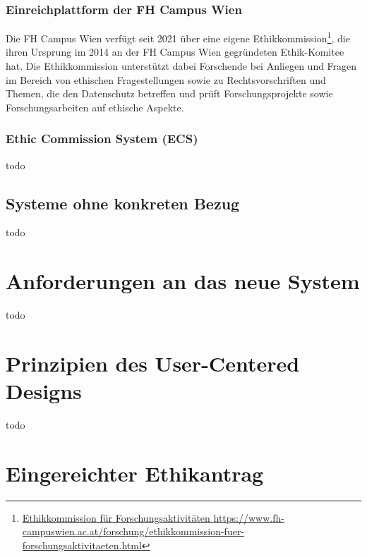 \documentclass[a4paper,12pt,twoside]{scrreprt}
\begin{document}
\subsection{Einreichplattform der FH Campus Wien}
\label{sub-sec:einreichplattform-fh-campus-wien}

Die FH Campus Wien verfügt seit 2021 über eine eigene Ethikkommission\footnote{\href{https://www.fh-campuswien.ac.at/forschung/ethikkommission-fuer-forschungsaktivitaeten.html}{Ethikkommission für Forschungsaktivitäten \url{https://www.fh-campuswien.ac.at/forschung/ethikkommission-fuer-forschungsaktivitaeten.html}}}, die ihren Ursprung im 2014 an der FH Campus Wien gegründeten Ethik-Komitee hat. Die Ethikkommission unterstützt dabei Forschende bei Anliegen und Fragen im Bereich von ethischen Fragestellungen sowie zu Rechtsvorschriften und Themen, die den Datenschutz betreffen und prüft Forschungsprojekte sowie Forschungsarbeiten auf ethische Aspekte. \cite{fh_campus_wien_ethikkommission_2023}

\subsection{Ethic Commission System (ECS)}
\label{sub-sec:ecs}

todo

\section{Systeme ohne konkreten Bezug}
\label{sec:systeme-ohne-bezug}

todo

\chapter{Anforderungen an das neue System}
\label{chap:anforderung-neues-system}

todo

\chapter{Prinzipien des User-Centered Designs}
\label{chap:prinzipien-user-centered-design}

todo

\clearpage
{}
{}
\printbibliography

\appendix

\chapter{Eingereichter Ethikantrag}
\label{appendix:eingereichter-ethikantrag}
\end{document}
